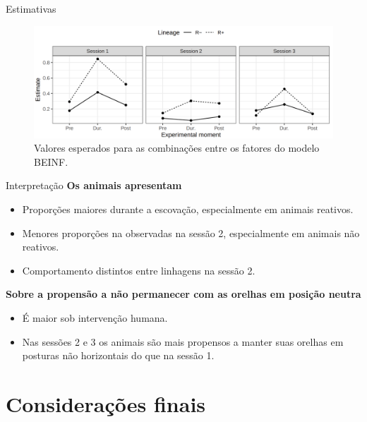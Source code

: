 \documentclass[
  ignorenonframetext,
  serif,
  professionalfont,
  usenames,
  dvipsnames,
  aspectratio = 169]{beamer}
\begin{document}
\begin{frame}{Estimativas}
\protect\hypertarget{estimativas-1}{}
\begin{figure}

{\centering \includegraphics[width=0.95\linewidth]{./img/interaction} 

}

\caption{Valores esperados para as combinações entre os fatores do modelo BEINF.}\label{fig:unnamed-chunk-14}
\end{figure}
\end{frame}

\begin{frame}{Interpretação}
\protect\hypertarget{interpretauxe7uxe3o-1}{}
\textbf{Os animais apresentam}

\begin{itemize}
\item
  Proporções maiores durante a escovação, especialmente em animais
  reativos.
\item
  Menores proporções na observadas na sessão 2, especialmente em animais
  não reativos.
\item
  Comportamento distintos entre linhagens na sessão 2.
\end{itemize}

\textbf{Sobre a propensão a não permanecer com as orelhas em posição neutra}

\begin{itemize}
\item
  É maior sob intervenção humana.
\item
  Nas sessões 2 e 3 os animais são mais propensos a manter suas orelhas
  em posturas não horizontais do que na sessão 1.
\end{itemize}
\end{frame}

\hypertarget{considerauxe7uxf5es-finais}{%
\section{Considerações finais}\label{considerauxe7uxf5es-finais}}
\end{document}
